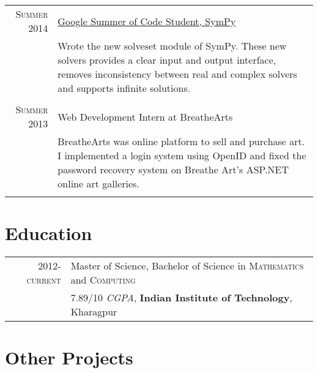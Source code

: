 \documentclass[a4paper,10pt]{article}
\begin{document}
\begin{tabular}{r|p{12cm}}
\textsc{Summer 2014} &
\href{https://github.com/sympy/sympy/wiki/GSoC-2014-Application-Harsh-Gupta:-Solvers}{Google
Summer of Code Student, SymPy}
\emph{}\\&\footnotesize{Wrote the new solveset module of SymPy. These new
solvers provides a clear input and output interface, removes inconsistency
between real and complex solvers and supports infinite solutions.}\\\multicolumn{2}{c}{} \\



\textsc{Summer 2013} & Web Development Intern at BreatheArts \emph{}\\&\footnotesize{

BreatheArts was online platform to sell and purchase art. I implemented a login
system using OpenID and fixed the password recovery system on Breathe Art's
ASP.NET online art galleries.

}\\\multicolumn{2}{c}{} \\

\end{tabular}

\section{Education}
\begin{tabular}{rl}
\textsc{2012-current} & Master of Science, Bachelor of Science in
    \textsc{Mathematics} and \textsc{Computing}
    \\&7.89/10 \small\emph{CGPA},
    \normalsize\textbf{Indian Institute of Technology}, Kharagpur\\
\end{tabular}

\section{Other Projects}
\end{document}
